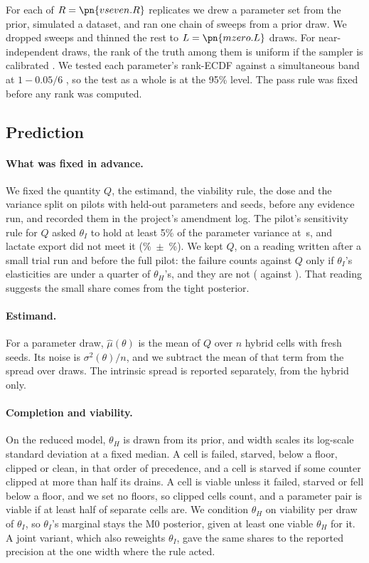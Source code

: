 For each of $R = \pn{vseven.R}$ replicates we drew a parameter set from the prior,
simulated a dataset, and ran one chain of  sweeps from a prior draw. We dropped
 sweeps and thinned the rest to $L = \pn{mzero.L}$ draws. For near-independent draws, the rank of the truth among them is uniform if the sampler is calibrated \cite{talts2018validating}. We tested
each parameter's rank-ECDF against a simultaneous band at $1 - 0.05/6$
\cite{sailynoja2022graphical}, so the test as a whole is at the 95\% level. The pass
rule was fixed before any rank was computed.

\subsection{Prediction}
\label{sec:prediction}

\paragraph{What was fixed in advance.} We fixed the quantity $Q$, the estimand, the
viability rule, the dose and the variance split on pilots with held-out parameters and
seeds, before any evidence run, and recorded them in the project's amendment log. The
pilot's sensitivity rule for $Q$ asked $\theta_I$ to hold at least 5\% of the parameter
variance at \,s, and lactate export did not meet it
(\%~$\pm$~\%). We kept $Q$, on a reading written after a
small trial run and before the full pilot: the failure counts against $Q$ only if
$\theta_I$'s elasticities are under a quarter of $\theta_H$'s, and they are not
( against ). That reading suggests the small share comes from the tight posterior.

\paragraph{Estimand.} For a parameter draw, $\hat\mu(\theta)$ is the mean of $Q$ over
$n$ hybrid cells with fresh seeds. Its noise is $\sigma^2(\theta)/n$, and we subtract the
mean of that term from the spread over draws. The intrinsic spread is reported
separately, from the hybrid only.

\paragraph{Completion and viability.} On the reduced model, $\theta_H$ is drawn from its
prior, and width scales its log-scale standard deviation at a fixed median. A cell is
failed, starved, below a floor, clipped or clean, in that order of precedence, and a cell
is starved if some counter clipped at more than half its drains. A cell is viable unless it failed, starved or fell below a floor, and we set no floors, so clipped cells count, and a parameter pair is viable if at least half of  separate cells are. We condition $\theta_H$ on viability per draw of $\theta_I$, so
$\theta_I$'s marginal stays the M0 posterior, given at least one viable $\theta_H$ for it.
A joint variant, which also reweights $\theta_I$, gave the same shares to the reported precision at the one width where the rule acted.

